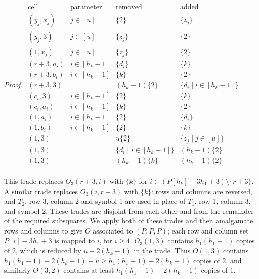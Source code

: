 \documentclass[10pt,a4paper]{amsart}
\begin{document}
\begin{proof}
    $\begin{array}{c|c|c|c}
    \text{cell} & \text{parameter} & \text{removed} & \text{added} \\
    \hline
    (y_j,x_j) & j\in [u] & \{2\} & \{z_j\} \\
    (y_j,3) & j\in [u] & \{z_j\} & \{2\} \\
    (1,x_j) & j\in [u] & \{z_j\} & \{2\} \\
    (r+3,a_i) & i\in [h_k-1] & \{d_i\} & \{k\} \\
    (r+3,b_i) & i\in [h_k-1] & \{k\} & \{2\} \\
    (r+3,3) && (h_k-1)\{2\} & \{d_i \mid i \in [h_k-1]\} \\
    (c_i,3) & i\in [h_k-1] & \{2\} & \{k\} \\
    (c_i,a_i) & i\in [h_k-1] & \{k\} & \{2\} \\
    (1,a_i) & i\in [h_k-1] & \{2\} & \{d_i\} \\
    (1,b_i) & i\in [h_k-1] & \{2\} & \{k\} \\
    (1,3) & & u\{2\} & \{z_j \mid j\in [u] \} \\
    (1,3) & & \{d_i \mid i\in [h_k-1] \} & (h_k-1)\{2\}\\
    (1,3) & & (h_k-1)\{k\} & (h_k-1)\{2\} \\
\end{array}$
\newline

This trade replaces $O_3(r+3,i)$ with $\{k\}$ for $i\in (P[h_k]-3h_1+3) \setminus \{r+3\}$. A similar trade replaces $O_3(i,r+3)$ with $\{k\}$: rows and columns are reversed, and $T_2$, row 3, column 2 and symbol 1 are used in place of $T_1$, row 1, column 3, and symbol 2. These trades are disjoint from each other and from the remainder of the required subsquares. We apply both of these trades and then amalgamate rows and columns to give $O$ associated to $(P,P,P)$; each row and column set $P[i]-3h_1+3$ is mapped to $i$, for $i\ge 4$. $O_3(1,3)$ contains $h_1(h_1-1)$ copies of $2$, which is reduced by $u-2(h_k-1)$ in the trade. Thus $O(1,3)$ contains $h_1(h_1-1)+2(h_k-1)-u \ge h_1(h_1-1)-2(h_k-1)$ copies of $2$, and similarly $O(3,2)$ contains at least $h_1(h_1-1)-2(h_k-1)$ copies of $1$.

\end{proof}
\end{document}

